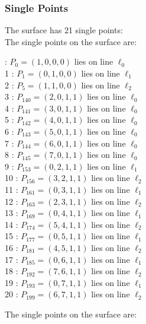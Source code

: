 \documentclass{article}
\begin{document}
{\subsubsection*{Single Points}
The surface has 21 single points:\\
The single points on the surface are:\\
\begin{multicols}{2}
 : $P_{0}=( 1, 0, 0, 0 )$ lies on line $\ell_{0}$\\
1 : $P_{1}=( 0, 1, 0, 0 )$ lies on line $\ell_{1}$\\
2 : $P_{5}=( 1, 1, 0, 0 )$ lies on line $\ell_{2}$\\
3 : $P_{140}=( 2, 0, 1, 1 )$ lies on line $\ell_{0}$\\
4 : $P_{141}=( 3, 0, 1, 1 )$ lies on line $\ell_{0}$\\
5 : $P_{142}=( 4, 0, 1, 1 )$ lies on line $\ell_{0}$\\
6 : $P_{143}=( 5, 0, 1, 1 )$ lies on line $\ell_{0}$\\
7 : $P_{144}=( 6, 0, 1, 1 )$ lies on line $\ell_{0}$\\
8 : $P_{145}=( 7, 0, 1, 1 )$ lies on line $\ell_{0}$\\
9 : $P_{153}=( 0, 2, 1, 1 )$ lies on line $\ell_{1}$\\
10 : $P_{156}=( 3, 2, 1, 1 )$ lies on line $\ell_{2}$\\
11 : $P_{161}=( 0, 3, 1, 1 )$ lies on line $\ell_{1}$\\
12 : $P_{163}=( 2, 3, 1, 1 )$ lies on line $\ell_{2}$\\
13 : $P_{169}=( 0, 4, 1, 1 )$ lies on line $\ell_{1}$\\
14 : $P_{174}=( 5, 4, 1, 1 )$ lies on line $\ell_{2}$\\
15 : $P_{177}=( 0, 5, 1, 1 )$ lies on line $\ell_{1}$\\
16 : $P_{181}=( 4, 5, 1, 1 )$ lies on line $\ell_{2}$\\
17 : $P_{185}=( 0, 6, 1, 1 )$ lies on line $\ell_{1}$\\
18 : $P_{192}=( 7, 6, 1, 1 )$ lies on line $\ell_{2}$\\
19 : $P_{193}=( 0, 7, 1, 1 )$ lies on line $\ell_{1}$\\
20 : $P_{199}=( 6, 7, 1, 1 )$ lies on line $\ell_{2}$\\
\end{multicols}
The single points on the surface are:\\
}
\end{document}
